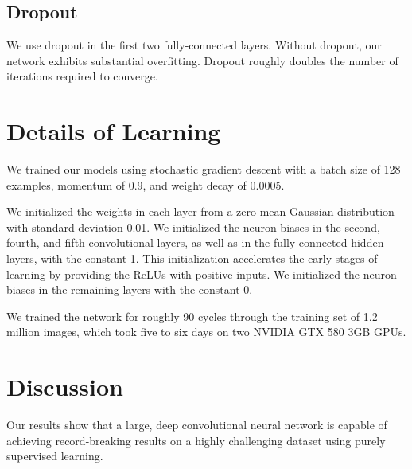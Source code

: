 \documentclass[a4paper,12pt]{article}
\begin{document}
\subsection{Dropout}

We use dropout in the first two fully-connected layers. Without dropout, our network exhibits substantial overfitting. Dropout roughly doubles the number of iterations required to converge.

\section{Details of Learning}

We trained our models using stochastic gradient descent with a batch size of 128 examples, momentum of 0.9, and weight decay of 0.0005.

We initialized the weights in each layer from a zero-mean Gaussian distribution with standard deviation 0.01. We initialized the neuron biases in the second, fourth, and fifth convolutional layers, as well as in the fully-connected hidden layers, with the constant 1. This initialization accelerates the early stages of learning by providing the ReLUs with positive inputs. We initialized the neuron biases in the remaining layers with the constant 0.

We trained the network for roughly 90 cycles through the training set of 1.2 million images, which took five to six days on two NVIDIA GTX 580 3GB GPUs.

\section{Discussion}

Our results show that a large, deep convolutional neural network is capable of achieving record-breaking results on a highly challenging dataset using purely supervised learning.
\end{document}
